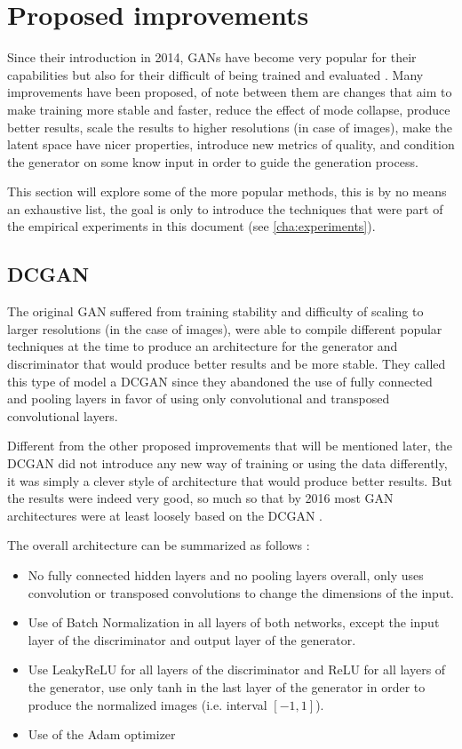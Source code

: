 \section{Proposed improvements}
Since their introduction in 2014, \acp{GAN} have become very popular for their capabilities but also for their difficult of being trained \cite{wgan-gp2017} and evaluated \cite{principled_gan_methods2017}. Many improvements have been proposed, of note between them are changes that aim to make training more stable and faster, reduce the effect of mode collapse, produce better results, scale the results to higher resolutions (in case of images), make the latent space have nicer properties, introduce new metrics of quality, and condition the generator on some know input in order to guide the generation process.

This section will explore some of the more popular methods, this is by no means an exhaustive list, the goal is only to introduce the techniques that were part of the empirical experiments in this document (see \autoref{cha:experiments}).

\subsection{DCGAN}
The original \gls{GAN} suffered from training stability and difficulty of scaling to larger resolutions (in the case of images), \textcite{dcgan2015} were able to compile different popular techniques at the time to produce an architecture for the generator and discriminator that would produce better results and be more stable. They called this type of model a \gls{DCGAN} since they abandoned the use of fully connected and pooling layers in favor of using only convolutional and transposed convolutional layers.

Different from the other proposed improvements that will be mentioned later, the \gls{DCGAN} did not introduce any new way of training or using the data differently, it was simply a clever style of architecture that would produce better results. But the results were indeed very good, so much so that by 2016 most \gls{GAN} architectures were at least loosely based on the \gls{DCGAN} \cite{nipsGAN2017}.

The overall architecture can be summarized as follows \cite{dcgan2015}:
\begin{itemize}
    \item No fully connected hidden layers and no pooling layers overall, only uses convolution or transposed convolutions to change the dimensions of the input.
    \item Use of Batch Normalization in all layers of both networks, except the input layer of the discriminator and output layer of the generator.
    \item Use LeakyReLU for all layers of the discriminator and ReLU for all layers of the generator, use only \gls{tanh} in the last layer of the generator in order to produce the normalized images (i.e. interval $[-1, 1]$).
    \item Use of the Adam optimizer
\end{itemize}

